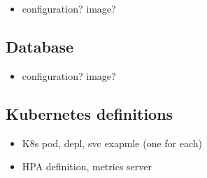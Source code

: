 \begin{itemize}
	\item configuration? image?
\end{itemize}

\subsection{Database}

\begin{itemize}
	\item configuration? image?
\end{itemize}


\subsection{Kubernetes definitions}


\begin{itemize}
	\item K8s pod, depl, svc exapmle (one for each)
	\item HPA definition, metrics server
\end{itemize}
















